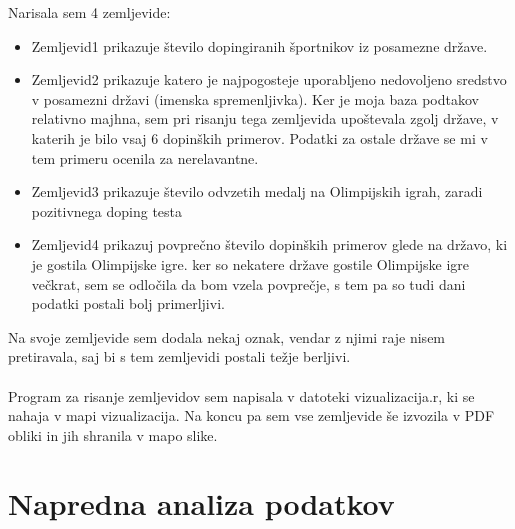 \documentclass[11pt,a4paper]{article}
\begin{document}
Narisala sem 4 zemljevide:
\begin{itemize}

\item{Zemljevid1 prikazuje število dopingiranih športnikov iz posamezne države.}


\item{Zemljevid2 prikazuje katero je najpogosteje uporabljeno nedovoljeno sredstvo v posamezni državi (imenska spremenljivka).
Ker je moja baza podtakov relativno majhna, sem pri risanju tega zemljevida upoštevala zgolj države, v katerih je bilo vsaj 6 dopinških primerov. Podatki za ostale države se mi v tem primeru ocenila za nerelavantne.}

\item{Zemljevid3 prikazuje število odvzetih medalj na Olimpijskih igrah, zaradi pozitivnega doping testa}

\item{Zemljevid4 prikazuj povprečno število dopinških primerov glede na državo, ki je gostila Olimpijske igre. 
ker so nekatere države gostile Olimpijske igre večkrat, sem se odločila da bom vzela povprečje, s tem pa so tudi dani podatki postali bolj primerljivi.}\\
\end{itemize}
Na svoje zemljevide sem dodala nekaj oznak, vendar z njimi raje nisem pretiravala, saj bi s tem zemljevidi postali težje berljivi.\\
\\
Program za risanje zemljevidov sem napisala v datoteki vizualizacija.r, ki se nahaja v mapi vizualizacija. 
Na koncu pa sem vse zemljevide še izvozila v PDF obliki in jih shranila v mapo slike.



\section{Napredna analiza podatkov}

\end{document}
